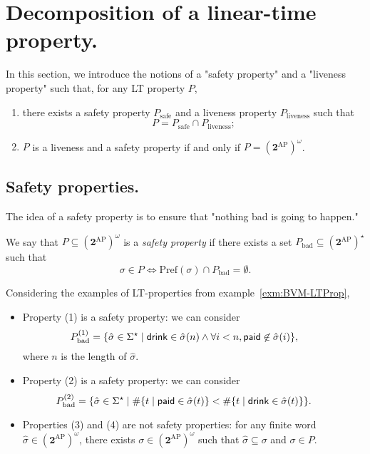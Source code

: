 \documentclass[./main]{subfiles}
\begin{document}
  \section{Decomposition of a linear-time property.}

  In this section, we introduce the notions of a "safety property" and a "liveness property" such that, for any LT property $P$,
  \begin{enumerate}
    \item there exists a safety property $P_\mathrm{safe}$ and a liveness property $P_\mathrm{liveness}$ such that \[
      P = P_\mathrm{safe} \cap P_\mathrm{liveness}
      ;\]
    \item $P$ is a liveness and a safety property if and only if $P = (\mathbf{2}^\mathrm{AP})^\omega$.
  \end{enumerate}

  \subsection{Safety properties.}

  The idea of a safety property is to ensure that "nothing bad is going to happen."

  \begin{en-defn}
    We say that $P \subseteq (\mathbf{2}^\mathrm{AP})^\omega$ is a \textit{safety property} if there exists a set $P_\mathrm{bad} \subseteq (\mathbf{2}^\mathrm{AP})^\star$ such that
    \[
    \sigma \in P \iff \mathrm{Pref}(\sigma) \cap P_\mathrm{bad} = \emptyset
    .\]
  \end{en-defn}

  \begin{en-exm}
    Considering the examples of LT-properties from example~\ref{exm:BVM-LTProp},
    \begin{itemize}
      \item Property (1) is a safety property: we can consider
        \[
          \hspace{-2em}
        P_\mathrm{bad}^{(1)} = \{\hat{\sigma} \in \Sigma^\star \mid \mathsf{drink} \in \hat{\sigma}(n) \land \forall i < n, \mathsf{paid} \not\in \hat{\sigma}(i) \},
        \] 
        where $n$ is the length of $\hat{\sigma}$.
      \item Property (2) is a safety property: we can consider
        \[
          \hspace{-2em}
        P_\mathrm{bad}^{(2)} = \{\hat{\sigma} \in \Sigma^\star \mid \# \{t  \mid \mathsf{paid} \in \hat{\sigma}(t)\} < \# \{t  \mid \mathsf{drink} \in \hat{\sigma}(t)\} \} .
        \]
      \item Properties (3) and (4) are not safety properties: for any finite word $\hat{\sigma} \in (\mathbf{2}^\mathrm{AP})^\omega$, there exists $\sigma \in (\mathbf{2}^\mathrm{AP})^\omega$ such that $\hat{\sigma} \subseteq \sigma$ and $\sigma \in P$.
    \end{itemize}
  \end{en-exm}
\end{document}
